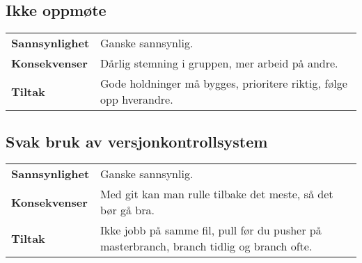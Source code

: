 \subsection*{Ikke oppmøte}
\begin{tabularx}{\linewidth}{l X}
\textbf{Sannsynlighet} & Ganske sannsynlig.\\
\textbf{Konsekvenser} & Dårlig stemning i gruppen, mer arbeid på andre.\\
\textbf{Tiltak} & Gode holdninger må bygges, prioritere riktig, følge opp hverandre.\\
\end{tabularx}

\subsection*{Svak bruk av versjonkontrollsystem}
\begin{tabularx}{\linewidth}{l X}
\textbf{Sannsynlighet} & Ganske sannsynlig.\\
\textbf{Konsekvenser} & Med git kan man rulle tilbake det meste, så det bør gå bra.\\
\textbf{Tiltak} & Ikke jobb på samme fil, pull før du pusher på masterbranch, branch tidlig og branch ofte.\\
\end{tabularx}